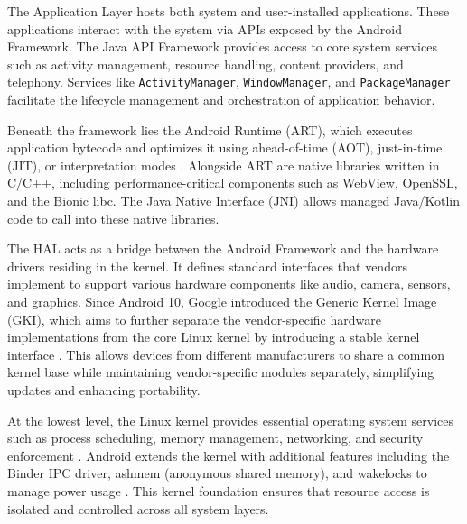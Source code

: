 \documentclass[a4paper,12pt]{report}
\begin{document}
The Application Layer hosts both system and user-installed applications. These applications interact with the system via APIs exposed by the Android Framework. The Java API Framework provides access to core system services such as activity management, resource handling, content providers, and telephony. Services like \texttt{ActivityManager}, \texttt{WindowManager}, and \texttt{PackageManager} facilitate the lifecycle management and orchestration of application behavior.

Beneath the framework lies the Android Runtime (ART), which executes application bytecode and optimizes it using ahead-of-time (AOT), just-in-time (JIT), or interpretation modes \cite{AOSPART}. Alongside ART are native libraries written in C/C++, including performance-critical components such as WebView, OpenSSL, and the Bionic libc. The Java Native Interface (JNI) allows managed Java/Kotlin code to call into these native libraries.

The HAL acts as a bridge between the Android Framework and the hardware drivers residing in the kernel. It defines standard interfaces that vendors implement to support various hardware components like audio, camera, sensors, and graphics. Since Android 10, Google introduced the Generic Kernel Image (GKI), which aims to further separate the vendor-specific hardware implementations from the core Linux kernel by introducing a stable kernel interface \cite{AOSPGKI}. This allows devices from different manufacturers to share a common kernel base while maintaining vendor-specific modules separately, simplifying updates and enhancing portability.

At the lowest level, the Linux kernel provides essential operating system services such as process scheduling, memory management, networking, and security enforcement \cite{love2010linux}. Android extends the kernel with additional features including the Binder IPC driver, ashmem (anonymous shared memory), and wakelocks to manage power usage \cite{feng2020survey}. This kernel foundation ensures that resource access is isolated and controlled across all system layers.
\end{document}
